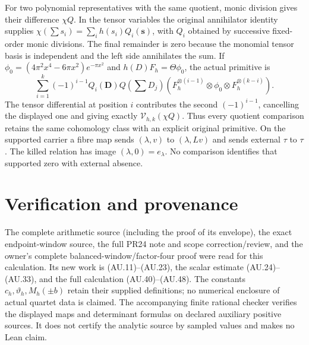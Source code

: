 \documentclass[11pt]{article}
\begin{document}
For two polynomial representatives with the same quotient, monic
division gives their difference $\chi Q$. In the tensor variables
the original annihilator identity supplies
$\chi(\sum s_i)=\sum_i h(s_i)Q_i(\mathbf s)$, with $Q_i$ obtained
by successive fixed-order monic divisions. The final remainder is
zero because the monomial tensor basis is independent and the
left side annihilates the sum. If
$\phi_0=(4\pi^2x^4-6\pi x^2)e^{-\pi x^2}$ and
$h(D)F_h=\Theta\phi_0$, the actual primitive is
\[
 \sum_{i=1}^k(-1)^{i-1}Q_i(\mathbf D)Q(\textstyle\sum D_j)
  (F_h^{\otimes(i-1)}\otimes\phi_0\otimes
                         F_h^{\otimes(k-i)}).             \tag{AU.49}
\]
The tensor differential at position $i$ contributes the second
$(-1)^{i-1}$, cancelling the displayed one and giving exactly
$\mathcal V_{h,k}(\chi Q)$. Thus every quotient comparison retains
the same cohomology class with an explicit original primitive.
On the supported carrier a fibre map sends $(\lambda,v)$ to
$(\lambda,Lv)$ and sends external $\tau$ to $\tau$. The killed
relation has image $(\lambda,0)=e_\lambda$.
No comparison identifies that supported zero with external absence.

\section{Verification and provenance}

The complete arithmetic source (including the proof of its envelope),
the exact endpoint-window source, the full PR24 note and scope
correction/review, and the owner's complete balanced-window/factor-four
proof were read for this calculation. Its new work is (AU.11)--(AU.23),
the scalar estimate (AU.24)--(AU.33), and the full calculation
(AU.40)--(AU.48).
The constants $c_h,\vartheta_h,M_h(\pm b)$ retain their supplied
definitions; no numerical enclosure of actual quartet data is claimed.
The accompanying finite rational checker verifies the displayed maps
and determinant formulas on declared auxiliary positive sources.
It does not certify the analytic source by sampled values and makes
no Lean claim.
\end{document}
